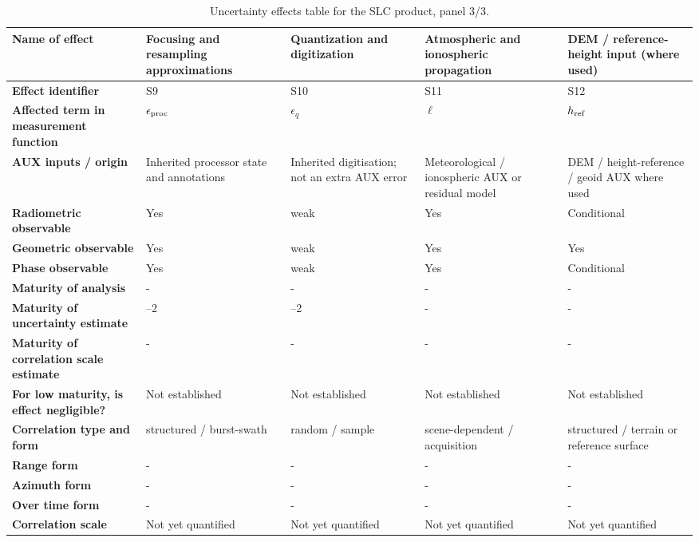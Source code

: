 \begin{table}[p]
\centering\scriptsize
\renewcommand{\arraystretch}{1.1}
\caption{Uncertainty effects table for the SLC product, panel 3/3.}
\label{tab:slc_effects_table_proposed_3}
\begin{tabularx}{\textwidth}{|>{\raggedright\arraybackslash}p{3.0cm}|*{4}{>{\raggedright\arraybackslash}X|}}\hline
\textbf{Name of effect} & Focusing and resampling approximations & Quantization and digitization & Atmospheric and ionospheric propagation & DEM / reference-height input (where used) \\ \hline
\textbf{Effect identifier} & S9 & S10 & S11 & S12 \\ \hline
\textbf{Affected term in measurement function} & $\epsilon_{\rm proc}$ & $\epsilon_q$ & $\boldsymbol\ell$ & $h_{\rm ref}$ \\ \hline
\textbf{AUX inputs / origin} & Inherited processor state and annotations & Inherited digitisation; not an extra AUX error & Meteorological / ionospheric AUX or residual model & DEM / height-reference / geoid AUX where used \\ \hline
\textbf{Radiometric observable} & Yes & weak & Yes & Conditional \\ \hline
\textbf{Geometric observable} & Yes & weak & Yes & Yes \\ \hline
\textbf{Phase observable} & Yes & weak & Yes & Conditional \\ \hline
\textbf{Maturity of analysis} & - & - & - & - \\ \hline
\textbf{Maturity of uncertainty estimate} & 1--2 & 1--2 & - & - \\ \hline
\textbf{Maturity of correlation scale estimate} & - & - & - & - \\ \hline
\textbf{For low maturity, is effect negligible?} & Not established & Not established & Not established & Not established \\ \hline
\textbf{Correlation type and form} & structured / burst-swath & random / sample & scene-dependent / acquisition & structured / terrain or reference surface \\ \hline
\textbf{Range form} & - & - & - & - \\ \hline
\textbf{Azimuth form} & - & - & - & - \\ \hline
\textbf{Over time form} & - & - & - & - \\ \hline
\textbf{Correlation scale} & Not yet quantified & Not yet quantified & Not yet quantified & Not yet quantified \\ \hline

\end{tabularx}
\end{table}
